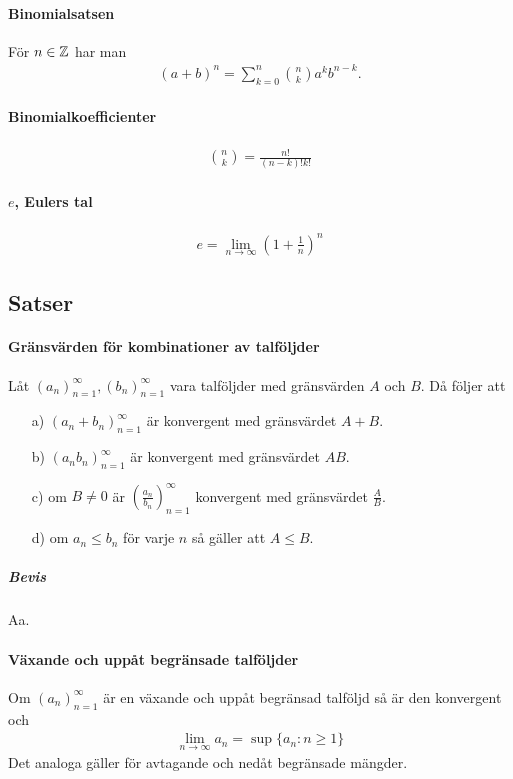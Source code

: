 \paragraph{Binomialsatsen}
För $n\in\mathbb{Z}$ har man
\begin{align*}
	(a + b)^n = \sum\limits_{k = 0}^{n} {{n}\choose{k}} a^kb^{n-k}.
\end{align*}

\paragraph{Binomialkoefficienter}
\begin{align*}
	{{n}\choose{k}} = \frac{n!}{(n-k)!k!}
\end{align*}

\paragraph{$e$, Eulers tal}
\begin{align*}
	e = \lim_{n\to\infty}\left(1 + \frac{1}{n}\right)^{n}
\end{align*}

\subsection{Satser}

\paragraph{Gränsvärden för kombinationer av talföljder}
Låt $\left(a_n\right)_{n = 1}^\infty, \left(b_n\right)_{n = 1}^\infty$ vara talföljder med gränsvärden $A$ och $B$. Då följer att
\begin{enumerate}
	\item[a)] $\left(a_n + b_n\right)_{n = 1}^\infty$ är konvergent med gränsvärdet $A + B$.
	\item[b)] $\left(a_n b_n\right)_{n = 1}^\infty$ är konvergent med gränsvärdet $AB$.
	\item[c)] om $B \neq 0$ är $\left(\frac{a_n}{b_n}\right)_{n = 1}^\infty$ konvergent med gränsvärdet $\frac{A}{B}$.
	\item[d)] om $a_n \leq b_n$ för varje $n$ så gäller att $A \leq B$.
\end{enumerate}

\subparagraph{Bevis}
Aa.

\paragraph{Växande och uppåt begränsade talföljder}
Om $\left(a_n\right)_{n = 1}^\infty$ är en växande och uppåt begränsad talföljd så är den konvergent och
\begin{align*}
	\lim_{n\to\infty} a_n = \sup{\{a_n: n \geq 1\}}
\end{align*}
Det analoga gäller för avtagande och nedåt begränsade mängder.

